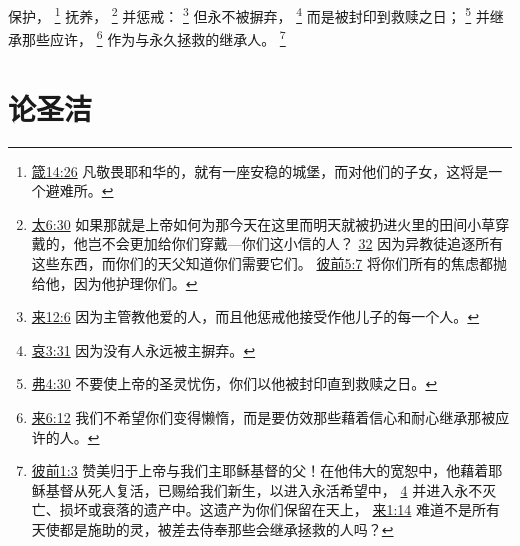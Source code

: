 \documentclass[12pt, a4paper, oneside]{ctexart}
\begin{document}
	保护，
	\footnote {
		\href{https://biblehub.com/proverbs/14-26.htm}{箴14:26} 凡敬畏耶和华的，就有一座安稳的城堡，而对他们的子女，这将是一个避难所。
	}
	抚养，
	\footnote {
		\href{https://biblehub.com/matthew/6-30.htm}{太6:30} 如果那就是上帝如何为那今天在这里而明天就被扔进火里的田间小草穿戴的，他岂不会更加给你们穿戴---你们这小信的人？
		\href{https://biblehub.com/matthew/6-32.htm}{32} 因为异教徒追逐所有这些东西，而你们的天父知道你们需要它们。
		\href{https://biblehub.com/1_peter/5-7.htm}{彼前5:7} 将你们所有的焦虑都抛给他，因为他护理你们。
	}
	并惩戒：
	\footnote {
		\href{https://biblehub.com/hebrews/12-6.htm}{来12:6} 因为主管教他爱的人，而且他惩戒他接受作他儿子的每一个人。
	}
	但永不被摒弃，
	\footnote {
		\href{https://biblehub.com/lamentations/3-31.htm}{哀3:31} 因为没有人永远被主摒弃。
	}
	而是被封印到救赎之日；
	\footnote {
		\href{https://biblehub.com/ephesians/4-30.htm}{弗4:30} 不要使上帝的圣灵忧伤，你们以他被封印直到救赎之日。
	}
	并继承那些应许，
	\footnote {
		\href{https://biblehub.com/hebrews/6-12.htm}{来6:12} 我们不希望你们变得懒惰，而是要仿效那些藉着信心和耐心继承那被应许的人。
	}
	作为与永久拯救的继承人。
	\footnote {
		\href{https://biblehub.com/1_peter/1-3.htm}{彼前1:3} 赞美归于上帝与我们主耶稣基督的父！在他伟大的宽恕中，他藉着耶稣基督从死人复活，已赐给我们新生，以进入永活希望中，
		\href{https://biblehub.com/1_peter/1-4.htm}{4} 并进入永不灭亡、损坏或衰落的遗产中。这遗产为你们保留在天上，
		\href{https://biblehub.com/hebrews/1-14.htm}{来1:14} 难道不是所有天使都是施助的灵，被差去侍奉那些会继承拯救的人吗？
	}

\section{论圣洁}
\end{document}
